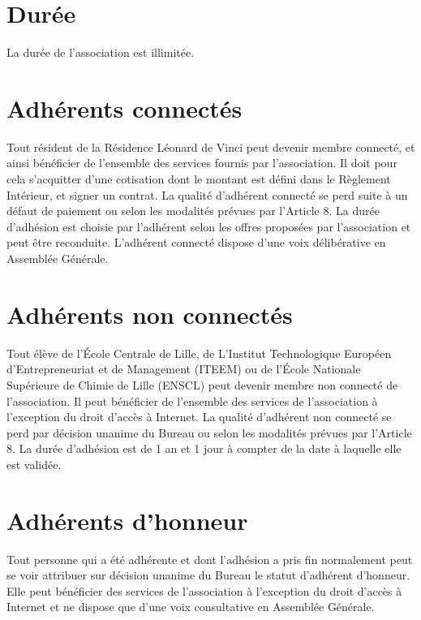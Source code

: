 \documentclass[12pt]{constitution}
\begin{document}
	\section{Durée}
	La durée de l'association est illimitée.


	\section{Adhérents connectés}
	Tout résident de la Résidence Léonard de Vinci peut devenir membre connecté, et ainsi bénéficier de l'ensemble des services fournis par l'association. Il doit pour cela s'acquitter d'une cotisation dont le montant est défini dans le Règlement Intérieur, et signer un contrat. La qualité d'adhérent connecté se perd suite à un défaut de paiement ou selon les modalités prévues par l'Article 8. La durée d'adhésion est choisie par l'adhérent selon les offres proposées par l'association et peut être reconduite. L'adhérent connecté dispose d'une voix délibérative en Assemblée Générale.

	\section{Adhérents non connectés}
	Tout élève de l'École Centrale de Lille, de L'Institut Technologique Européen d'Entrepreneuriat et de Management (ITEEM) ou de l'École Nationale Supérieure de Chimie de Lille (ENSCL) peut devenir membre non connecté de l'association. Il peut bénéficier de l'ensemble des services de l'association à l'exception du droit d'accès à Internet. La qualité d'adhérent non connecté se perd par décision unanime du Bureau ou selon les modalités prévues par l'Article 8. La durée d'adhésion est de 1 an et 1 jour à compter de la date à laquelle elle est validée.

	\section{Adhérents d'honneur}
	Tout personne qui a été adhérente et dont l'adhésion a pris fin normalement peut se voir attribuer sur décision unanime du Bureau le statut d'adhérent d'honneur. Elle peut bénéficier des services de l'association à l'exception du droit d'accès à Internet et ne dispose que d'une voix consultative en Assemblée Générale.
\end{document}
